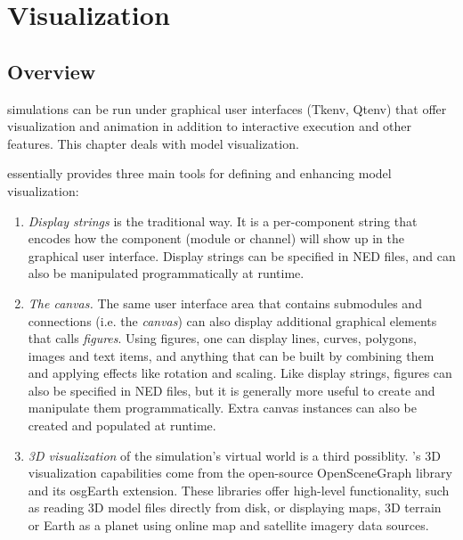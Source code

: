 \chapter{Visualization}
\label{cha:graphics}

\section{Overview}
\label{sec:graphics:overview}

{\opp} simulations can be run under graphical user interfaces (Tkenv,
Qtenv) that offer visualization and animation in addition to interactive
execution and other features. This chapter deals with model visualization.

{\opp} essentially provides three main tools for defining and enhancing
model visualization:

\begin{enumerate}

    \item \textit{Display strings} is the traditional way. It is a
    per-component string that encodes how the component (module or channel)
    will show up in the graphical user interface. Display strings can be
    specified in NED files, and can also be manipulated programmatically at
    runtime.

    \item \textit{The canvas.} The same user interface area that contains
    submodules and connections (i.e. the \textit{canvas}) can also display
    additional graphical elements that {\opp} calls \textit{figures}. Using
    figures, one can display lines, curves, polygons, images and text items,
    and anything that can be built by combining them and applying effects like
    rotation and scaling. Like display strings, figures can also be specified
    in NED files, but it is generally more useful to create and manipulate them
    programmatically. Extra canvas instances can also be created and populated
    at runtime.

    \item \textit{3D visualization} of the simulation's virtual world is a
    third possiblity. {\opp}'s 3D visualization capabilities come from the
    open-source OpenSceneGraph library and its osgEarth extension. These
    libraries offer high-level functionality, such as reading 3D model files
    directly from disk, or displaying maps, 3D terrain or Earth as a planet
    using online map and satellite imagery data sources.

\end{enumerate}

